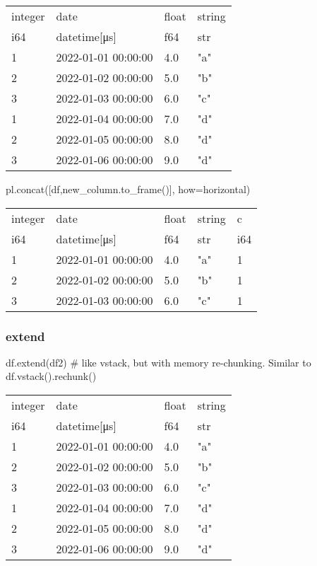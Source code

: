 \documentclass[
  letterpaper,
  DIV=11,
  numbers=noendperiod]{scrartcl}
\newenvironment{Shaded}{\begin{snugshade}}{\end{snugshade}}
\newcommand{\CommentTok}[1]{\textcolor[rgb]{0.37,0.37,0.37}{#1}}
\newcommand{\NormalTok}[1]{\textcolor[rgb]{0.00,0.23,0.31}{#1}}
\newcommand{\OperatorTok}[1]{\textcolor[rgb]{0.37,0.37,0.37}{#1}}
\newcommand{\StringTok}[1]{\textcolor[rgb]{0.13,0.47,0.30}{#1}}
\begin{document}
\begin{longtable}[]{@{}llll@{}}
\toprule()
integer & date & float & string \\
i64 & datetime{[}μs{]} & f64 & str \\
\midrule()
\endhead
1 & 2022-01-01 00:00:00 & 4.0 & "a" \\
2 & 2022-01-02 00:00:00 & 5.0 & "b" \\
3 & 2022-01-03 00:00:00 & 6.0 & "c" \\
1 & 2022-01-04 00:00:00 & 7.0 & "d" \\
2 & 2022-01-05 00:00:00 & 8.0 & "d" \\
3 & 2022-01-06 00:00:00 & 9.0 & "d" \\
\bottomrule()
\end{longtable}

\begin{Shaded}
\begin{Highlighting}[]
\NormalTok{pl.concat([df,new\_column.to\_frame()], how}\OperatorTok{=}\StringTok{\textquotesingle{}horizontal\textquotesingle{}}\NormalTok{)}
\end{Highlighting}
\end{Shaded}

\begin{longtable}[]{@{}lllll@{}}
\toprule()
integer & date & float & string & c \\
i64 & datetime{[}μs{]} & f64 & str & i64 \\
\midrule()
\endhead
1 & 2022-01-01 00:00:00 & 4.0 & "a" & 1 \\
2 & 2022-01-02 00:00:00 & 5.0 & "b" & 1 \\
3 & 2022-01-03 00:00:00 & 6.0 & "c" & 1 \\
\bottomrule()
\end{longtable}

\hypertarget{extend}{%
\subsubsection{extend}\label{extend}}

\begin{Shaded}
\begin{Highlighting}[]
\NormalTok{df.extend(df2) }\CommentTok{\# like vstack, but with memory re{-}chunking. Similar to df.vstack().rechunk()}
\end{Highlighting}
\end{Shaded}

\begin{longtable}[]{@{}llll@{}}
\toprule()
integer & date & float & string \\
i64 & datetime{[}μs{]} & f64 & str \\
\midrule()
\endhead
1 & 2022-01-01 00:00:00 & 4.0 & "a" \\
2 & 2022-01-02 00:00:00 & 5.0 & "b" \\
3 & 2022-01-03 00:00:00 & 6.0 & "c" \\
1 & 2022-01-04 00:00:00 & 7.0 & "d" \\
2 & 2022-01-05 00:00:00 & 8.0 & "d" \\
3 & 2022-01-06 00:00:00 & 9.0 & "d" \\
\bottomrule()
\end{longtable}
\end{document}
